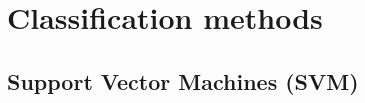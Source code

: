 \documentclass[../main.tex]{subfiles}
\begin{document}
\section{Classification methods}

\subsection{Support Vector Machines (SVM)}
\end{document}
